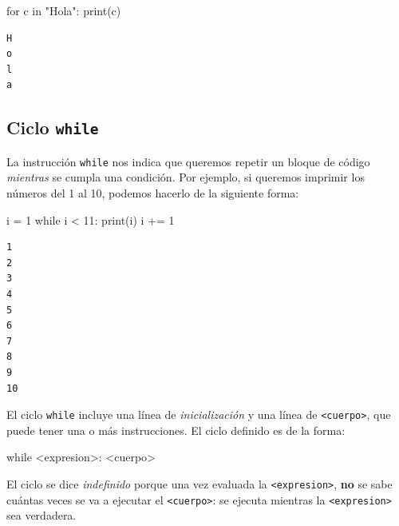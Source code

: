 \documentclass[
  letterpaper,
  DIV=11,
  numbers=noendperiod]{scrreprt}
\newenvironment{Shaded}{\begin{snugshade}}{\end{snugshade}}
\newcommand{\BuiltInTok}[1]{\textcolor[rgb]{0.00,0.23,0.31}{#1}}
\newcommand{\ControlFlowTok}[1]{\textcolor[rgb]{0.00,0.23,0.31}{#1}}
\newcommand{\DecValTok}[1]{\textcolor[rgb]{0.68,0.00,0.00}{#1}}
\newcommand{\KeywordTok}[1]{\textcolor[rgb]{0.00,0.23,0.31}{#1}}
\newcommand{\NormalTok}[1]{\textcolor[rgb]{0.00,0.23,0.31}{#1}}
\newcommand{\OperatorTok}[1]{\textcolor[rgb]{0.37,0.37,0.37}{#1}}
\newcommand{\StringTok}[1]{\textcolor[rgb]{0.13,0.47,0.30}{#1}}
\begin{document}
\begin{Shaded}
\begin{Highlighting}[]
\ControlFlowTok{for}\NormalTok{ c }\KeywordTok{in} \StringTok{"Hola"}\NormalTok{:}
    \BuiltInTok{print}\NormalTok{(c)}
\end{Highlighting}
\end{Shaded}

\begin{verbatim}
H
o
l
a
\end{verbatim}

\subsection{\texorpdfstring{Ciclo
\texttt{while}}{Ciclo while}}\label{ciclo-while}

La instrucción \texttt{while} nos indica que queremos repetir un bloque
de código \emph{mientras} se cumpla una condición. Por ejemplo, si
queremos imprimir los números del 1 al 10, podemos hacerlo de la
siguiente forma:

\begin{Shaded}
\begin{Highlighting}[]
\NormalTok{i }\OperatorTok{=} \DecValTok{1}
\ControlFlowTok{while}\NormalTok{ i }\OperatorTok{\textless{}} \DecValTok{11}\NormalTok{:}
    \BuiltInTok{print}\NormalTok{(i)}
\NormalTok{    i }\OperatorTok{+=} \DecValTok{1}
\end{Highlighting}
\end{Shaded}

\begin{verbatim}
1
2
3
4
5
6
7
8
9
10
\end{verbatim}

El ciclo \texttt{while} incluye una línea de \emph{inicialización} y una
línea de \texttt{\textless{}cuerpo\textgreater{}}, que puede tener una o
más instrucciones. El ciclo definido es de la forma:

\begin{Shaded}
\begin{Highlighting}[]
\ControlFlowTok{while} \OperatorTok{\textless{}}\NormalTok{expresion}\OperatorTok{\textgreater{}}\NormalTok{:}
    \OperatorTok{\textless{}}\NormalTok{cuerpo}\OperatorTok{\textgreater{}}
\end{Highlighting}
\end{Shaded}

El ciclo se dice \emph{indefinido} porque una vez evaluada la
\texttt{\textless{}expresion\textgreater{}}, \textbf{no} se sabe cuántas
veces se va a ejecutar el \texttt{\textless{}cuerpo\textgreater{}}: se
ejecuta mientras la \texttt{\textless{}expresion\textgreater{}} sea
verdadera.
\end{document}
